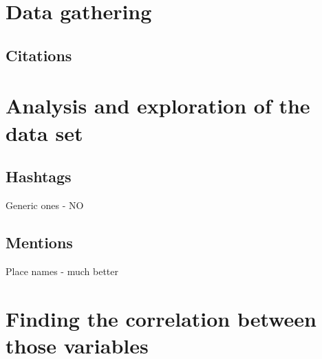 \documentclass[bsc,frontabs,twoside,singlespacing,parskip]{infthesis}
\begin{document}
\chapter{Data gathering}

\section{Citations}

\chapter{Analysis and exploration of the data set}

\section{Hashtags}

Generic ones - NO

\section{Mentions} 

Place names - much better

\chapter{Finding the correlation between those variables}




\end{document}
